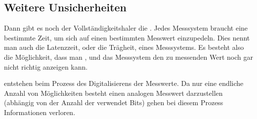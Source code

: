 \documentclass[letterpaper,10pt,english]{jupyterBook}
\begin{document}
\subsection{Weitere Unsicherheiten}
\label{\detokenize{content/1_Messunsicherheiten:weitere-unsicherheiten}}
\sphinxAtStartPar
Dann gibt es noch der Vollständigkeitshaler die . Jedes Messsystem braucht eine bestimmte Zeit, um sich auf einen bestimmten Messwert einzupedeln. Dies nennt man auch die Latenzzeit, oder die Trägheit, eines Messsystems. Es besteht also die Möglichkeit, dass man , und das Messsystem den zu messenden Wert noch gar nicht richtig anzeigen kann.

\sphinxAtStartPar
{} entstehen beim Prozess des Digitalisierens der Messwerte. Da nur eine endliche Anzahl von Möglichkeiten besteht einen analogen Messwert darzustellen (abhängig von der Anzahl der verwendet Bits) gehen bei diesem Prozess  Informationen verloren.
\end{document}
